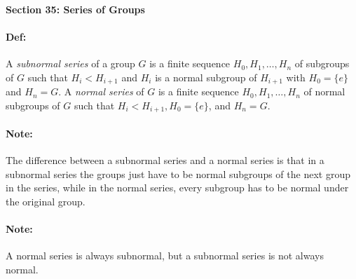 \documentclass[10pt,a4paper]{article}
\begin{document}
\begin{center}
\textbf{Section 35: Series of Groups}
\end{center}

\paragraph{Def:} A \textit{subnormal series} of a group $G$ is a finite sequence $H_0, H_1, \dots, H_n$ of subgroups of $G$ such that $H_i < H_{i+1}$ and $H_i$ is a normal subgroup of $H_{i+1}$ with $H_0 = \{e\}$ and $H_n = G$. A \textit{normal series} of $G$ is a finite sequence $H_0, H_1, \dots, H_n$ of normal subgroups of $G$ such that $H_i < H_{i+1}, H_0 = \{e\}$, and $H_n=G$.

\paragraph{Note:} The difference between a subnormal series and a normal series is that in a subnormal series the groups just have to be normal subgroups of the next group in the series, while in the normal series, every subgroup has to be normal under the original group.

\paragraph{Note:} A normal series is always subnormal, but a subnormal series is not always normal.
\end{document}
